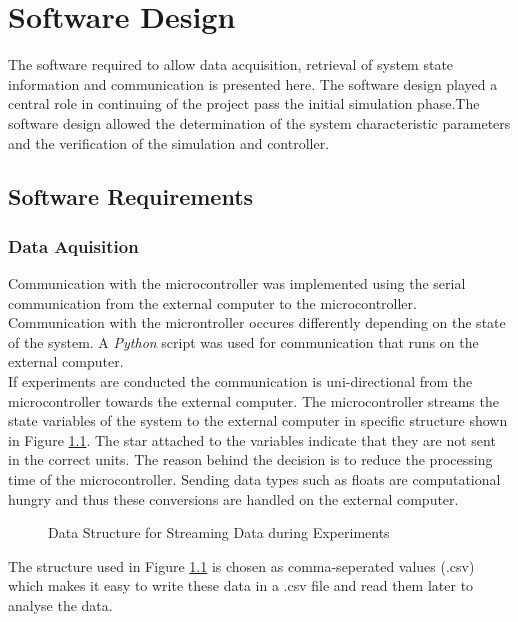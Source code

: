 \chapter{Software Design}
\label{chp5:software}

The software required to allow data acquisition, retrieval of system state information and communication is presented here. The software design played a central role in continuing of the project pass the initial simulation phase.The software design allowed the determination of the system characteristic parameters and the verification of the simulation and controller.

\section{Software Requirements}
\label{sec:software_requirements}

\subsection{Data Aquisition}
Communication with the microcontroller was implemented using the serial communication from the external computer to the microcontroller. Communication with the microntroller occures differently depending on the state of the system. A \textit{Python} script was used for communication that runs on the external computer.\\

If experiments are conducted the communication is uni-directional from the microcontroller towards the external computer. The microcontroller streams the state variables of the system to the external computer in specific structure shown in Figure \ref{fig:data_struct}. The star attached to the variables indicate that they are not sent in the correct units. The reason behind the decision is to reduce the processing time of the microcontroller. Sending data types such as floats are computational hungry and thus these conversions are handled on the external computer.

\begin{figure}[h]
	\centering
	
	\caption{Data Structure for Streaming Data during Experiments}
	\label{fig:data_struct}
\end{figure}

The structure used in Figure \ref{fig:data_struct} is chosen as comma-seperated values (.csv) which makes it easy to write these data in a .csv file and read them later to analyse the data.\\

